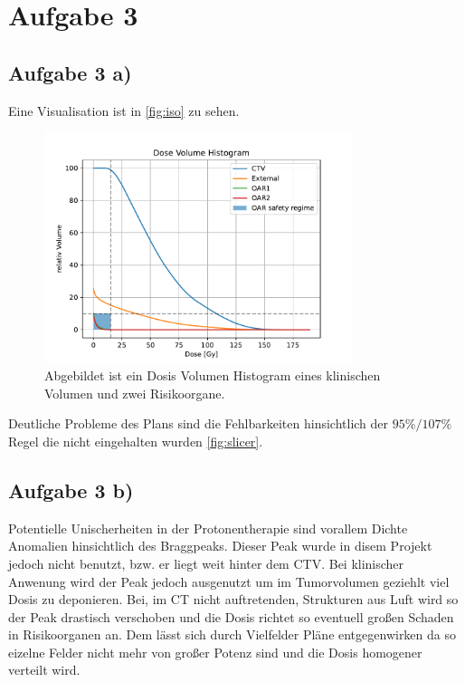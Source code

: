 \section{Aufgabe 3}
\subsection{Aufgabe 3 a)}
Eine Visualisation ist in \ref{fig:iso} zu sehen. 
\begin{figure}
    \centering
    \includegraphics[width  = 0.8\textwidth]{content/DVH.pdf}
    \caption{Abgebildet ist ein Dosis Volumen Histogram eines klinischen Volumen und zwei Risikoorgane.}
    \label{fig:dvh}
\end{figure}
Deutliche Probleme des Plans sind die Fehlbarkeiten hinsichtlich der $95\% / 107\%$ Regel die nicht eingehalten wurden \ref{fig:slicer}.

\subsection{Aufgabe 3 b)}
Potentielle Unischerheiten in der Protonentherapie sind vorallem Dichte Anomalien hinsichtlich des Braggpeaks. 
Dieser Peak wurde in disem Projekt jedoch nicht benutzt, bzw. er liegt weit hinter dem CTV. Bei klinischer Anwenung wird der Peak jedoch ausgenutzt
um im Tumorvolumen geziehlt viel Dosis zu deponieren. Bei, im CT nicht auftretenden, Strukturen aus Luft wird so der Peak drastisch verschoben 
und die Dosis richtet so eventuell großen Schaden in Risikoorganen an. Dem lässt sich durch Vielfelder Pläne entgegenwirken da so 
eizelne Felder nicht mehr von großer Potenz sind und die Dosis homogener verteilt wird.